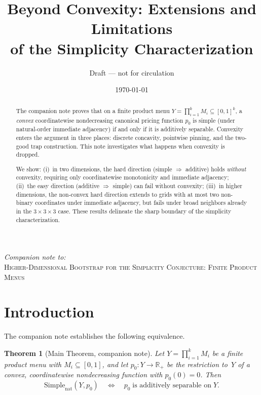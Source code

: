 \documentclass[11pt]{article}
\title{Beyond Convexity: Extensions and Limitations\\
of the Simplicity Characterization}
\author{Draft --- not for circulation}
\date{\today}
\newtheorem{theorem}{Theorem}[section]
\newcommand{\R}{\mathbb{R}}
\newcommand{\Rp}{\R_+}
\newcommand{\Simplenat}{\mathrm{Simple}_{\mathrm{nat}}}
\begin{document}
\maketitle

\begin{center}
\emph{Companion note to:}\\[2pt]
\textsc{Higher-Dimensional Bootstrap for the Simplicity Conjecture: Finite Product Menus}
\end{center}

\bigskip

\begin{abstract}
The companion note proves that on a finite product menu
$Y = \prod_{i=1}^k M_i \subseteq [0,1]^k$, a \emph{convex}
coordinatewise nondecreasing canonical pricing function $p_0$ is
simple (under natural-order immediate adjacency) if and only if it is
additively separable.  Convexity enters the argument in three places:
discrete concavity, pointwise pinning, and the two-good trap
construction.  This note investigates what happens when
convexity is dropped.

We show:
(i)~in two dimensions, the hard direction (simple $\Rightarrow$
additive) holds \emph{without} convexity, requiring only
coordinatewise monotonicity and immediate adjacency;
(ii)~the easy direction (additive $\Rightarrow$ simple) can fail
without convexity;
(iii)~in higher dimensions, the non-convex hard direction extends to
grids with at most two non-binary coordinates under immediate
adjacency, but fails under broad neighbors already in the
$3\times 3\times 3$ case.
These results delineate the sharp boundary of the simplicity
characterization.
\end{abstract}

\section{Introduction}\label{sec:intro}

The companion note establishes the following equivalence.

\begin{theorem}[Main Theorem, companion note]\label{thm:companion}
Let $Y = \prod_{i=1}^k M_i$ be a finite product menu with
$M_i \subseteq [0,1]$, and let $p_0 \colon Y \to \Rp$ be the
restriction to~$Y$ of a convex, coordinatewise nondecreasing function
with $p_0(0) = 0$.  Then
\[
  \Simplenat(Y, p_0) \quad\Longleftrightarrow\quad
  p_0 \;\text{is additively separable on}\; Y.
\]
\end{theorem}
\end{document}

